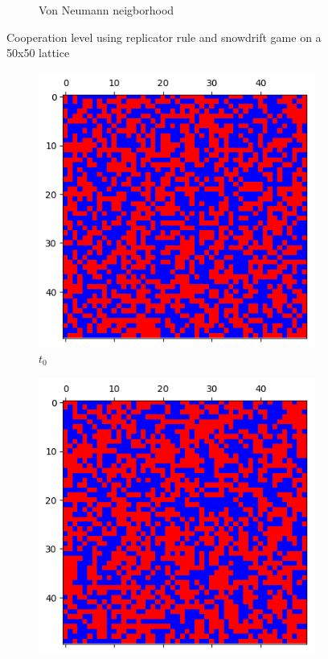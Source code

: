 \documentclass[letterpaper]{article}
\begin{document}
\begin{figure}
\begin{subfigure}{.5\textwidth}
        \caption{Von Neumann neigborhood}
        \label{fig:50vonpart2}
    \end{subfigure}
    \caption{Cooperation level using replicator rule and
    snowdrift game on a 50x50 lattice}
    \label{fig:50part2}
\end{figure}

\begin{figure}
    \begin{subfigure}{.33\textwidth}
      \centering
      \includegraphics[width=1\linewidth]{images/assign2/visu_50-part2/t0}
      \caption{$t_0$}
      \label{fig:t0_50part2}
    \end{subfigure}
    \begin{subfigure}{.33\textwidth}
      \centering
      \includegraphics[width=1\linewidth]{images/assign2/visu_50-part2/t1}

\end{subfigure}
\end{figure}
\end{document}
